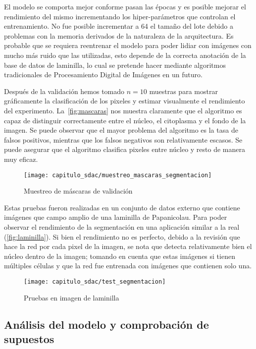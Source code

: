 El modelo se comporta mejor conforme pasan las épocas y es posible mejorar el
rendimiento del mismo incrementando los hiper-parámetros que controlan el
entrenamiento. No fue posible incrementar a 64 el tamaño del lote debido a
problemas con la memoria derivados de la naturaleza de la arquitectura. Es
probable que se requiera reentrenar el modelo para poder lidiar con imágenes con
mucho más ruido que las utilizadas, esto depende de la correcta anotación de la
base de datos de laminilla, lo cual se pretende hacer mediante algoritmos
tradicionales de Procesamiento Digital de Imágenes en un futuro.

Después de la validación hemos tomado \(n = 10\) muestras para mostrar
gráficamente la clasificación de los pixeles y estimar visualmente el
rendimiento del experimento. La~\autoref{fig:mascaras} nos muestra claramente
que el algoritmo es capaz de distinguir correctamente entre el núcleo, el
citoplasma y el fondo de la imagen. Se puede observar que el mayor problema del
algoritmo es la tasa de falsos positivos, mientras que los falsos negativos son
relativamente escasos. Se puede asegurar que el algoritmo clasifica pixeles
entre núcleo y resto de manera muy eficaz.

\begin{figure}[H]
    \centering
    \texttt{[image: capitulo\_sdac/muestreo\_mascaras\_segmentacion]}
    \caption{Muestreo de máscaras de validación}\label{fig:mascaras}
\end{figure}

Estas pruebas fueron realizadas en un conjunto de datos externo que contiene
imágenes que campo amplio de una laminilla de Papanicolau. Para poder observar
el rendimiento de la segmentación en una aplicación similar a la real
(\autoref{fig:laminilla}). Si bien el rendimiento no es perfecto, debido a la
revisión que hace la red por cada pixel de la imagen, se nota que detecta
relativamente bien el núcleo dentro de la imagen; tomando en cuenta que estas
imágenes si tienen múltiples células y que la red fue entrenada con imágenes que
contienen solo una.

\begin{figure}[H]
    \centering
    \texttt{[image: capitulo\_sdac/test\_segmentacion]}
    \caption{Pruebas en imagen de laminilla}\label{fig:laminilla}
\end{figure}

\subsection{Análisis del modelo y comprobación de supuestos}


